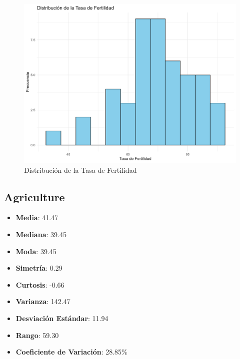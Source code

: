 \documentclass{article}
\begin{document}
\begin{figure}[h!]
\centering
\includegraphics[width=\textwidth]{Histogramas/histogram_fertility.png}
\caption{Distribución de la Tasa de Fertilidad}
\end{figure}

\subsection{Agriculture}
\begin{itemize}
    \item \textbf{Media}: 41.47
    \item \textbf{Mediana}: 39.45
    \item \textbf{Moda}: 39.45
    \item \textbf{Simetría}: 0.29
    \item \textbf{Curtosis}: -0.66
    \item \textbf{Varianza}: 142.47
    \item \textbf{Desviación Estándar}: 11.94
    \item \textbf{Rango}: 59.30
    \item \textbf{Coeficiente de Variación}: 28.85\%
\end{itemize}
\end{document}
